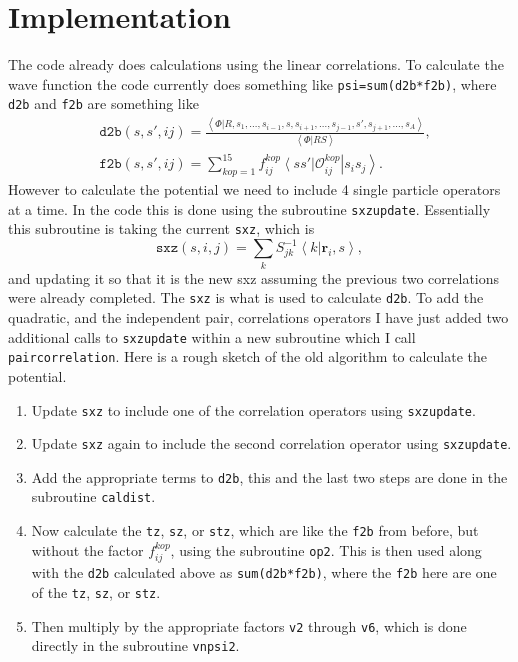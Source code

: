 \documentclass[12pt]{article}
\newcommand{\ket}[1]{\left| #1 \right>}
\newcommand{\bra}[1]{\left< #1 \right|}
\newcommand{\braket}[2]{\left< #1 | #2 \right>}
\newcommand{\longsij}{s_1, \ldots, s_{i-1} , s, s_{i+1}, \ldots, s_{j-1}, s', s_{j+1}, \ldots ,s_A}
\begin{document}
\section{Implementation}
The code already does calculations using the linear correlations. To calculate the wave function the code currently does something like \texttt{psi=sum(d2b*f2b)}, where \texttt{d2b} and \texttt{f2b} are something like
\begin{align}
   &\texttt{d2b}(s,s',ij)=\frac{\braket{\Phi}{R,\longsij}}{\braket{\Phi}{RS}}, \\
   &\texttt{f2b}(s,s',ij)=\sum\limits_{kop=1}^{15}f^{kop}_{ij}\bra{ss'}\mathcal{O}^{kop}_{ij}\ket{s_is_j}.
\end{align}
However to calculate the potential we need to include 4 single particle operators at a time. In the code this is done using the subroutine \texttt{sxzupdate}. Essentially this subroutine is taking the current \texttt{sxz}, which is
\begin{equation}
   \texttt{sxz}(s,i,j)=\sum\limits_k S^{-1}_{jk}\braket{k}{\mathbf{r}_i,s},
\end{equation}
and updating it so that it is the new sxz assuming the previous two correlations were already completed. The \texttt{sxz} is what is used to calculate \texttt{d2b}. To add the quadratic, and the independent pair, correlations operators I have just added two additional calls to \texttt{sxzupdate} within a new subroutine which I call \texttt{paircorrelation}. Here is a rough sketch of the old algorithm to calculate the potential.
\begin{enumerate}
   \item Update \texttt{sxz} to include one of the correlation operators using \texttt{sxzupdate}.
   \item Update \texttt{sxz} again to include the second correlation operator using \texttt{sxzupdate}.
   \item Add the appropriate terms to \texttt{d2b}, this and the last two steps are done in the subroutine \texttt{caldist}.
   \item Now calculate the \texttt{tz}, \texttt{sz}, or \texttt{stz}, which are like the \texttt{f2b} from before, but without the factor $f^{kop}_{ij}$, using the subroutine \texttt{op2}. This is then used along with the \texttt{d2b} calculated above as \texttt{sum(d2b*f2b)}, where the \texttt{f2b} here are one of the \texttt{tz}, \texttt{sz}, or \texttt{stz}.
   \item Then multiply by the appropriate factors \texttt{v2} through \texttt{v6}, which is done directly in the subroutine \texttt{vnpsi2}.
\end{enumerate}
\end{document}
